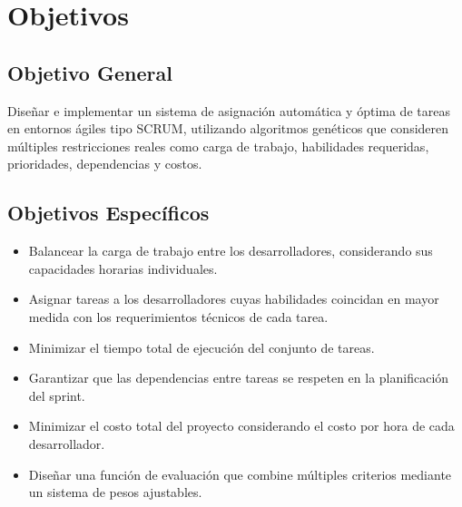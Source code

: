\section{Objetivos}

\subsection*{Objetivo General}
Diseñar e implementar un sistema de asignación automática y óptima de tareas en entornos ágiles tipo SCRUM, utilizando algoritmos genéticos que consideren múltiples restricciones reales como carga de trabajo, habilidades requeridas, prioridades, dependencias y costos.

\subsection*{Objetivos Específicos}
\begin{itemize}
    \item Balancear la carga de trabajo entre los desarrolladores, considerando sus capacidades horarias individuales.
    \item Asignar tareas a los desarrolladores cuyas habilidades coincidan en mayor medida con los requerimientos técnicos de cada tarea.
    \item Minimizar el tiempo total de ejecución del conjunto de tareas.
    \item Garantizar que las dependencias entre tareas se respeten en la planificación del sprint.
    \item Minimizar el costo total del proyecto considerando el costo por hora de cada desarrollador.
    \item Diseñar una función de evaluación que combine múltiples criterios mediante un sistema de pesos ajustables.
\end{itemize}





